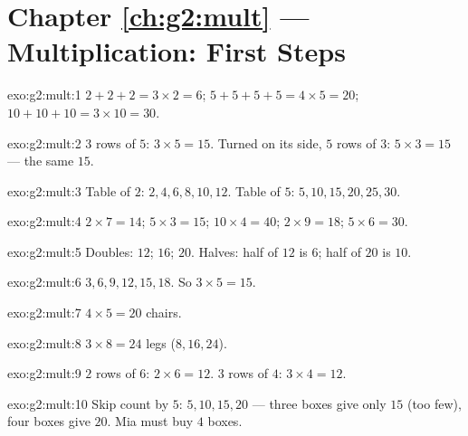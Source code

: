 \section*{Chapter \ref{ch:g2:mult} --- Multiplication: First Steps}

\begin{solution}{exo:g2:mult:1}
$2 + 2 + 2 = 3 \times 2 = 6$; \quad
$5 + 5 + 5 + 5 = 4 \times 5 = 20$; \quad
$10 + 10 + 10 = 3 \times 10 = 30$.
\end{solution}

\begin{solution}{exo:g2:mult:2}
$3$ rows of $5$: $3 \times 5 = 15$. Turned on its side, $5$ rows of
$3$: $5 \times 3 = 15$ --- the same $15$.
\end{solution}

\begin{solution}{exo:g2:mult:3}
Table of $2$: $2, 4, 6, 8, 10, 12$. Table of $5$:
$5, 10, 15, 20, 25, 30$.
\end{solution}

\begin{solution}{exo:g2:mult:4}
$2 \times 7 = 14$; \quad $5 \times 3 = 15$; \quad
$10 \times 4 = 40$; \quad $2 \times 9 = 18$; \quad
$5 \times 6 = 30$.
\end{solution}

\begin{solution}{exo:g2:mult:5}
Doubles: $12$; $16$; $20$. Halves: half of $12$ is $6$; half of
$20$ is $10$.
\end{solution}

\begin{solution}{exo:g2:mult:6}
$3, 6, 9, 12, 15, 18$. So $3 \times 5 = 15$.
\end{solution}

\begin{solution}{exo:g2:mult:7}
$4 \times 5 = 20$ chairs.
\end{solution}

\begin{solution}{exo:g2:mult:8}
$3 \times 8 = 24$ legs ($8, 16, 24$).
\end{solution}

\begin{solution}{exo:g2:mult:9}
$2$ rows of $6$: $2 \times 6 = 12$. $3$ rows of $4$:
$3 \times 4 = 12$.
\end{solution}

\begin{solution}{exo:g2:mult:10}
Skip count by $5$: $5, 10, 15, 20$ --- three boxes give only $15$
(too few), four boxes give $20$. Mia must buy $4$ boxes.
\end{solution}
